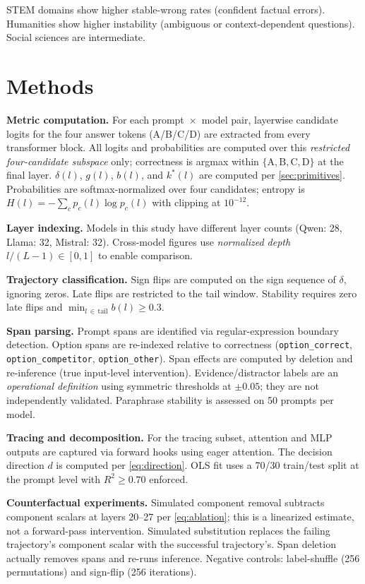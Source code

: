 \documentclass{article}
\begin{document}
STEM domains show higher stable-wrong rates (confident factual errors).  Humanities show higher instability (ambiguous or context-dependent questions).  Social sciences are intermediate.

\section{Methods}
\label{sec:methods}

\textbf{Metric computation.}  For each prompt~$\times$~model pair, layerwise candidate logits for the four answer tokens (A/B/C/D) are extracted from every transformer block.  All logits and probabilities are computed over this \emph{restricted four-candidate subspace} only; correctness is argmax within $\{\mathrm{A},\mathrm{B},\mathrm{C},\mathrm{D}\}$ at the final layer.  $\delta(l)$, $g(l)$, $b(l)$, and $k^*(l)$ are computed per \cref{sec:primitives}.  Probabilities are softmax-normalized over four candidates; entropy is $H(l) = -\!\sum_c p_c(l)\log p_c(l)$ with clipping at $10^{-12}$.

\textbf{Layer indexing.}  Models in this study have different layer counts (Qwen: 28, Llama: 32, Mistral: 32).  Cross-model figures use \emph{normalized depth} $l/(L{-}1) \in [0,1]$ to enable comparison.

\textbf{Trajectory classification.}  Sign flips are computed on the sign sequence of $\delta$, ignoring zeros.  Late flips are restricted to the tail window.  Stability requires zero late flips and $\min_{l\, \in\, \mathrm{tail}} b(l) \geq 0.3$.

\textbf{Span parsing.}  Prompt spans are identified via regular-expression boundary detection.  Option spans are re-indexed relative to correctness (\texttt{option\_correct}, \texttt{option\_competitor}, \texttt{option\_other}).  Span effects are computed by deletion and re-inference (true input-level intervention).  Evidence/distractor labels are an \emph{operational definition} using symmetric thresholds at $\pm 0.05$; they are not independently validated.  Paraphrase stability is assessed on 50 prompts per model.

\textbf{Tracing and decomposition.}  For the tracing subset, attention and MLP outputs are captured via forward hooks using eager attention.  The decision direction $d$ is computed per \cref{eq:direction}.  OLS fit uses a 70/30 train/test split at the prompt level with $R^2 \geq 0.70$ enforced.

\textbf{Counterfactual experiments.}  Simulated component removal subtracts component scalars at layers 20--27 per \cref{eq:ablation}; this is a linearized estimate, not a forward-pass intervention.  Simulated substitution replaces the failing trajectory's component scalar with the successful trajectory's.  Span deletion actually removes spans and re-runs inference.  Negative controls: label-shuffle (256 permutations) and sign-flip (256 iterations).
\end{document}
